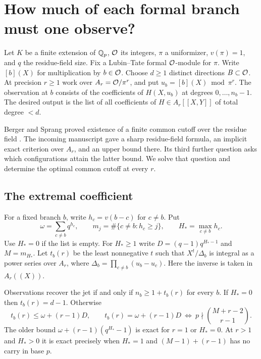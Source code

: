 \section{How much of each formal branch must one observe?}
Let $K$ be a finite extension of $\mathbb Q_p$, $\mathcal O$ its integers, $\pi$ a uniformizer, $v(\pi)=1$, and $q$ the residue-field size. Fix a Lubin--Tate formal $\mathcal O$-module for $\pi$. Write $[b](X)$ for multiplication by $b\in\mathcal O$. Choose $d\ge1$ distinct directions $B\subset\mathcal O$. At precision $r\ge1$ work over $A_r=\mathcal O/\pi^r$, and put $u_b=[b](X)\bmod\pi^r$. The observation at $b$ consists of the coefficients of $H(X,u_b)$ at degrees $0,\ldots,n_b-1$. The desired output is the list of all coefficients of $H\in A_r[[X,Y]]$ of total degree $<d$.

Berger and Sprang proved existence of a finite common cutoff over the residue field \cite[Lemma 4.2]{bs}. The incoming manuscript \cite{oldbranches} gave a sharp residue-field formula, an implicit exact criterion over $A_r$, and an upper bound there. Its third further question asks which configurations attain the latter bound. We solve that question and determine the optimal common cutoff at every $r$.

\subsection{The extremal coefficient}
For a fixed branch $b$, write $h_c=v(b-c)$ for $c\ne b$. Put
\[
 \omega=\sum_{c\ne b}q^{h_c},\qquad
 m_j=\#\{c\ne b:h_c\ge j\},\qquad H_*=\max_{c\ne b}h_c.
\]
Use $H_*=0$ if the list is empty. For $H_*\ge1$ write $D=(q-1)q^{H_*-1}$ and $M=m_{H_*}$. Let $t_b(r)$ be the least nonnegative $t$ such that $X^t/\Delta_b$ is integral as a power series over $A_r$, where $\Delta_b=\prod_{c\ne b}(u_b-u_c)$. Here the inverse is taken in $A_r((X))$.

\begin{theorem}\label{thm:branches}
Observations recover the jet if and only if $n_b\ge1+t_b(r)$ for every $b$. If $H_*=0$ then $t_b(r)=d-1$. Otherwise
\[
 t_b(r)\le\omega+(r-1)D,\qquad
 t_b(r)=\omega+(r-1)D
 \ \Longleftrightarrow\
 p\nmid {M+r-2\choose r-1}.
\]
The older bound $\omega+(r-1)(q^{H_*}-1)$ is exact for $r=1$ or $H_*=0$. At $r>1$ and $H_*>0$ it is exact precisely when $H_*=1$ and $(M-1)+(r-1)$ has no carry in base $p$.
\end{theorem}

